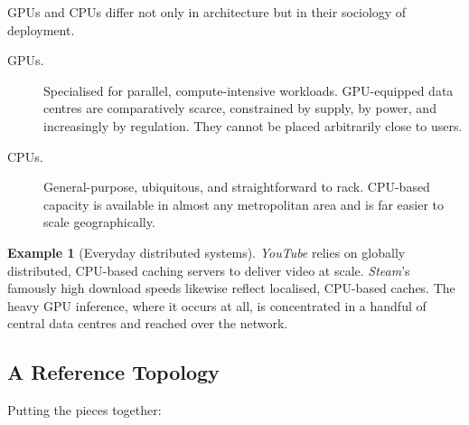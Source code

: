 \documentclass[11pt,a4paper]{article}
\theoremstyle{definition}
\newtheorem{example}[definition]{Example}
\theoremstyle{remark}
\begin{document}
GPUs and CPUs differ not only in architecture but in their sociology of deployment.

\begin{description}
    \item[GPUs.] Specialised for parallel, compute-intensive workloads. GPU-equipped data centres are comparatively scarce, constrained by supply, by power, and increasingly by regulation. They cannot be placed arbitrarily close to users.
    \item[CPUs.] General-purpose, ubiquitous, and straightforward to rack. CPU-based capacity is available in almost any metropolitan area and is far easier to scale geographically.
\end{description}

\begin{example}[Everyday distributed systems]
\emph{YouTube} relies on globally distributed, CPU-based caching servers to deliver video at scale. \emph{Steam}'s famously high download speeds likewise reflect localised, CPU-based caches. The heavy GPU inference, where it occurs at all, is concentrated in a handful of central data centres and reached over the network.
\end{example}

\subsection{A Reference Topology}

Putting the pieces together:

\begin{center}
\end{center}
\end{document}
